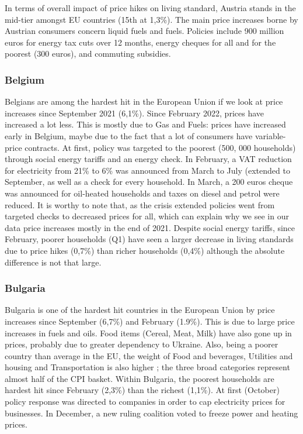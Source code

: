 \documentclass[
  9pt,
  a4paper,
  DIV=11,
  numbers=noendperiod,
  oneside]{scrartcl}
\begin{document}
In terms of overall impact of price hikes on living standard, Austria
stands in the mid-tier amongst EU countries (15th at 1,3\%). The main
price increases borne by Austrian consumers concern liquid fuels and
fuels. Policies include 900 million euros for energy tax cuts over 12
months, energy cheques for all and for the poorest (300 euros), and
commuting subsidies.

\hypertarget{belgium}{%
\subsubsection{Belgium}\label{belgium}}

Belgians are among the hardest hit in the European Union if we look at
price increases since September 2021 (6,1\%). Since February 2022,
prices have increased a lot less. This is mostly due to Gas and Fuels:
prices have increased early in Belgium, maybe due to the fact that a lot
of consumers have variable-price contracts. At first, policy was
targeted to the poorest (500, 000 households) through social energy
tariffs and an energy check. In February, a VAT reduction for
electricity from 21\% to 6\% was announced from March to July (extended
to September, as well as a check for every household. In March, a 200
euros cheque was announced for oil-heated households and taxes on diesel
and petrol were reduced. It is worthy to note that, as the crisis
extended policies went from targeted checks to decreased prices for all,
which can explain why we see in our data price increases mostly in the
end of 2021. Despite social energy tariffs, since February, poorer
households (Q1) have seen a larger decrease in living standards due to
price hikes (0,7\%) than richer households (0,4\%) although the absolute
difference is not that large.

\hypertarget{bulgaria}{%
\subsubsection{Bulgaria}\label{bulgaria}}

Bulgaria is one of the hardest hit countries in the European Union by
price increases since September (6,7\%) and February (1.9\%). This is
due to large price increases in fuels and oils. Food items (Cereal,
Meat, Milk) have also gone up in prices, probably due to greater
dependency to Ukraine. Also, being a poorer country than average in the
EU, the weight of Food and beverages, Utilities and housing and
Transportation is also higher ; the three broad categories represent
almost half of the CPI basket. Within Bulgaria, the poorest households
are hardest hit since February (2,3\%) than the richest (1,1\%). At
first (October) policy response was directed to companies in order to
cap electricity prices for businesses. In December, a new ruling
coalition voted to freeze power and heating prices.
\end{document}
